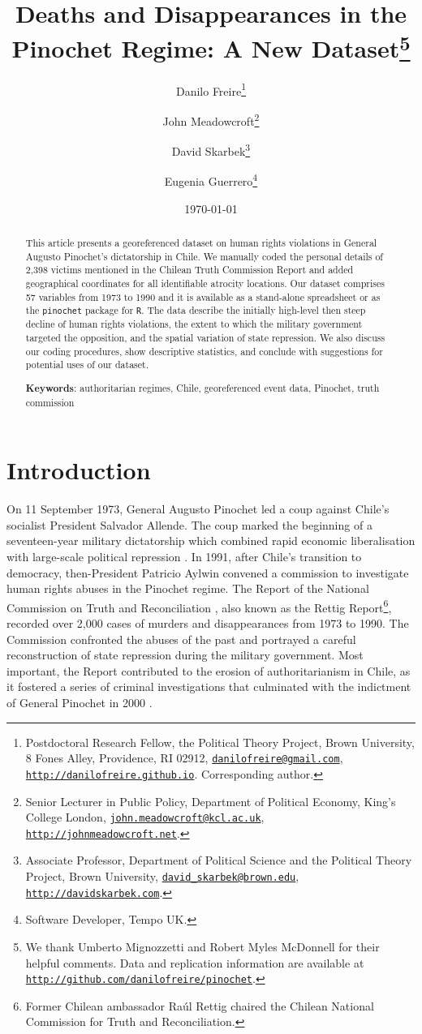 \documentclass[12pt,a4paper,]{article}
\title{\textbf{Deaths and Disappearances in the Pinochet Regime: A New Dataset}\thanks{We thank Umberto Mignozzetti and Robert Myles McDonnell for their
helpful comments. Data and replication information are available at
\href{http://github.com/danilofreire/pinochet}{\texttt{http://github.com/danilofreire/pinochet}}.}}
\author{Danilo Freire\footnote{Postdoctoral Research Fellow, the Political
  Theory Project, Brown University, 8 Fones Alley, Providence, RI 02912,
  \href{mailto:danilofreire@gmail.com}{\texttt{danilofreire@gmail.com}},
  \href{http://danilofreire.github.io}{\texttt{http://danilofreire.github.io}}.
  Corresponding author.} \and John Meadowcroft\footnote{Senior Lecturer in Public Policy, Department
  of Political Economy, King's College London,
  \href{mailto:john.meadowcroft@kcl.ac.uk}{\texttt{john.meadowcroft@kcl.ac.uk}},
  \href{http://johnmeadowcroft.net}{\texttt{http://johnmeadowcroft.net}}.} \and David Skarbek\footnote{Associate Professor, Department of Political
  Science and the Political Theory Project, Brown University,
  \href{david_skarbek@brown.edu}{\texttt{david\_skarbek@brown.edu}},
  \href{http://davidskarbek.com}{\texttt{http://davidskarbek.com}}.} \and Eugenia Guerrero\footnote{Software Developer, Tempo UK.}}
\date{\today}
\begin{document}
\maketitle

\begin{abstract}
\noindent This article presents a georeferenced dataset on human rights violations
in General Augusto Pinochet's dictatorship in Chile. We manually coded
the personal details of 2,398 victims mentioned in the Chilean Truth
Commission Report and added geographical coordinates for all
identifiable atrocity locations. Our dataset comprises 57 variables from
1973 to 1990 and it is available as a stand-alone spreadsheet or as the
\texttt{pinochet} package for \texttt{R}. The data describe the
initially high-level then steep decline of human rights violations, the
extent to which the military government targeted the opposition, and the
spatial variation of state repression. We also discuss our coding
procedures, show descriptive statistics, and conclude with suggestions
for potential uses of our dataset.
\vspace{.5cm}

\noindent \textbf{Keywords}: authoritarian regimes, Chile, georeferenced event data, Pinochet, truth
commission
\vspace{.25cm}

\end{abstract}
\newpage

\hypertarget{introduction}{%
\section{\texorpdfstring{Introduction\label{sec:intro}}{Introduction}}\label{introduction}}

\setlength{\parindent}{1cm}
\setlength{\parskip}{0pt}

On 11 September 1973, General Augusto Pinochet led a coup against
Chile's socialist President Salvador Allende. The coup marked the
beginning of a seventeen-year military dictatorship which combined rapid
economic liberalisation with large-scale political repression
\citep{meadowcroft2014hayek, valdes1995pinochet}. In 1991, after Chile's
transition to democracy, then-President Patricio Aylwin convened a
commission to investigate human rights abuses in the Pinochet regime.
The Report of the National Commission on Truth and Reconciliation
\citeyearpar{report1991}, also known as the Rettig Report\footnote{Former
  Chilean ambassador Raúl Rettig chaired the Chilean National Commission
  for Truth and Reconciliation.}, recorded over 2,000 cases of murders
and disappearances from 1973 to 1990. The Commission confronted the
abuses of the past and portrayed a careful reconstruction of state
repression during the military government. Most important, the Report
contributed to the erosion of authoritarianism in Chile, as it fostered
a series of criminal investigations that culminated with the indictment
of General Pinochet in 2000 \citep[ 26]{brahm2007uncovering}.
\end{document}
